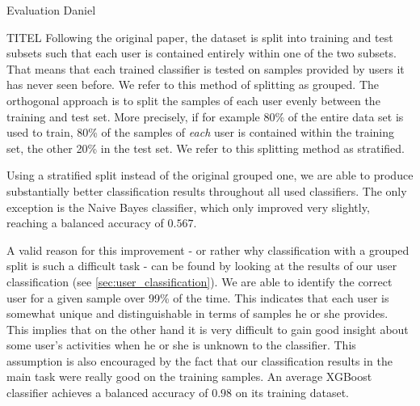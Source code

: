 \begin{section}{Evaluation Daniel}
	\begin{subsection}{TITEL}\label{subsec:stratified}
		Following the original paper, the dataset is split into training and test subsets such that each user is contained entirely within one of the two subsets. That means that each trained classifier is tested on samples provided by users it has never seen before. We refer to this method of splitting as \glqq grouped\grqq{}. The orthogonal approach is to split the samples of each user evenly between the training and test set. More precisely, if for example 80\% of the entire data set is used to train, 80\% of the samples of \emph{each} user is contained within the training set, the other 20\% in the test set. We refer to this splitting method as \glqq stratified\grqq{}. \par
		Using a stratified split instead of the original grouped one, we are able to produce substantially better classification results throughout all used classifiers. The only exception is the Naive Bayes classifier, which only improved very slightly, reaching a balanced accuracy of $0.567$. \par
		A valid reason for this improvement - or rather why classification with a grouped split is such a difficult task - can be found by looking at the results of our user classification (see \ref{sec:user_classification}). We are able to identify the correct user for a given sample over 99\% of the time. This indicates that each user is somewhat unique and distinguishable in terms of samples he or she provides. This implies that on the other hand it is very difficult to gain good insight about some user's activities when he or she is unknown to the classifier. This assumption is also encouraged by the fact that our classification results in the main task were really good on the training samples. An average XGBoost classifier achieves a balanced accuracy of $0.98$ on its training dataset. 
	\end{subsection}

\end{section}